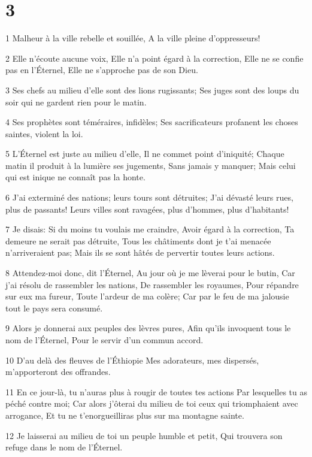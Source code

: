 \chapter{3}

\par 1 Malheur à la ville rebelle et souillée, A la ville pleine d'oppresseurs!
\par 2 Elle n'écoute aucune voix, Elle n'a point égard à la correction, Elle ne se confie pas en l'Éternel, Elle ne s'approche pas de son Dieu.
\par 3 Ses chefs au milieu d'elle sont des lions rugissants; Ses juges sont des loups du soir qui ne gardent rien pour le matin.
\par 4 Ses prophètes sont téméraires, infidèles; Ses sacrificateurs profanent les choses saintes, violent la loi.
\par 5 L'Éternel est juste au milieu d'elle, Il ne commet point d'iniquité; Chaque matin il produit à la lumière ses jugements, Sans jamais y manquer; Mais celui qui est inique ne connaît pas la honte.
\par 6 J'ai exterminé des nations; leurs tours sont détruites; J'ai dévasté leurs rues, plus de passants! Leurs villes sont ravagées, plus d'hommes, plus d'habitants!
\par 7 Je disais: Si du moins tu voulais me craindre, Avoir égard à la correction, Ta demeure ne serait pas détruite, Tous les châtiments dont je t'ai menacée n'arriveraient pas; Mais ils se sont hâtés de pervertir toutes leurs actions.
\par 8 Attendez-moi donc, dit l'Éternel, Au jour où je me lèverai pour le butin, Car j'ai résolu de rassembler les nations, De rassembler les royaumes, Pour répandre sur eux ma fureur, Toute l'ardeur de ma colère; Car par le feu de ma jalousie tout le pays sera consumé.
\par 9 Alors je donnerai aux peuples des lèvres pures, Afin qu'ils invoquent tous le nom de l'Éternel, Pour le servir d'un commun accord.
\par 10 D'au delà des fleuves de l'Éthiopie Mes adorateurs, mes dispersés, m'apporteront des offrandes.
\par 11 En ce jour-là, tu n'auras plus à rougir de toutes tes actions Par lesquelles tu as péché contre moi; Car alors j'ôterai du milieu de toi ceux qui triomphaient avec arrogance, Et tu ne t'enorgueilliras plus sur ma montagne sainte.
\par 12 Je laisserai au milieu de toi un peuple humble et petit, Qui trouvera son refuge dans le nom de l'Éternel.

